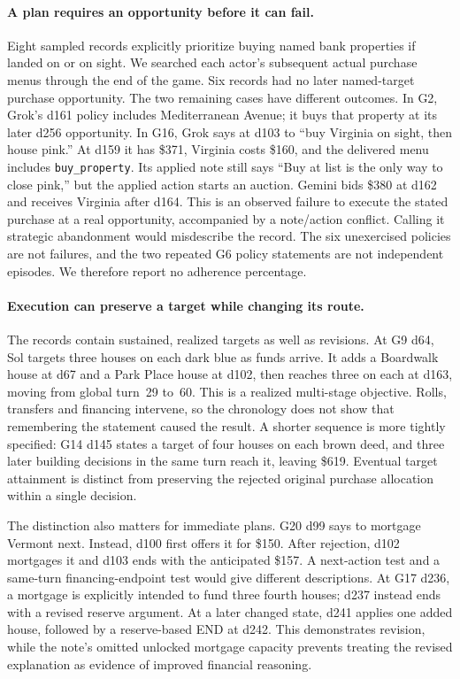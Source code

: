 \paragraph{A plan requires an opportunity before it can fail.}
Eight sampled records explicitly prioritize buying named bank properties if landed on or on sight. We searched each actor's subsequent actual purchase menus through the end of the game. Six records had no later named-target purchase opportunity. The two remaining cases have different outcomes. In G2, Grok's d161 policy includes Mediterranean Avenue; it buys that property at its later d256 opportunity. In G16, Grok says at d103 to ``buy Virginia on sight, then house pink.'' At d159 it has \$371, Virginia costs \$160, and the delivered menu includes \texttt{buy\_property}. Its applied note still says ``Buy at list is the only way to close pink,'' but the applied action starts an auction. Gemini bids \$380 at d162 and receives Virginia after d164. This is an observed failure to execute the stated purchase at a real opportunity, accompanied by a note/action conflict. Calling it strategic abandonment would misdescribe the record. The six unexercised policies are not failures, and the two repeated G6 policy statements are not independent episodes. We therefore report no adherence percentage.

\paragraph{Execution can preserve a target while changing its route.}
The records contain sustained, realized targets as well as revisions. At G9 d64, Sol targets three houses on each dark blue as funds arrive. It adds a Boardwalk house at d67 and a Park Place house at d102, then reaches three on each at d163, moving from global turn~29 to~60. This is a realized multi-stage objective. Rolls, transfers and financing intervene, so the chronology does not show that remembering the statement caused the result. A shorter sequence is more tightly specified: G14 d145 states a target of four houses on each brown deed, and three later building decisions in the same turn reach it, leaving \$619. Eventual target attainment is distinct from preserving the rejected original purchase allocation within a single decision.

The distinction also matters for immediate plans. G20 d99 says to mortgage Vermont next. Instead, d100 first offers it for \$150. After rejection, d102 mortgages it and d103 ends with the anticipated \$157. A next-action test and a same-turn financing-endpoint test would give different descriptions. At G17 d236, a mortgage is explicitly intended to fund three fourth houses; d237 instead ends with a revised reserve argument. At a later changed state, d241 applies one added house, followed by a reserve-based END at d242. This demonstrates revision, while the note's omitted unlocked mortgage capacity prevents treating the revised explanation as evidence of improved financial reasoning.

